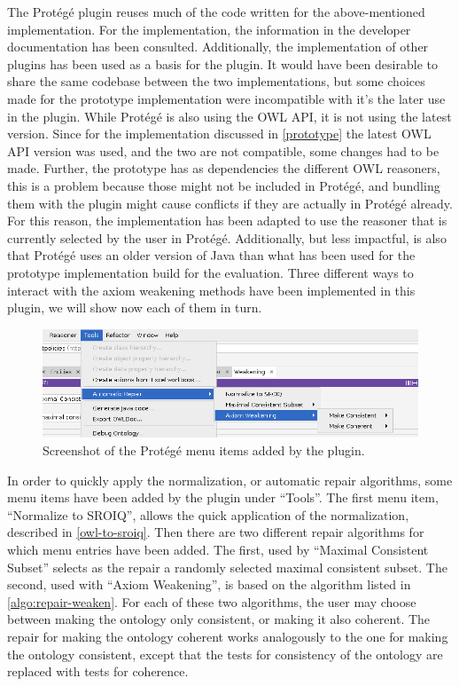 
The Protégé plugin reuses much of the code written for the above-mentioned implementation. For the implementation, the information in the developer documentation \cite{protege5devdocs} has been consulted. Additionally, the implementation of other plugins \cite{ontodebug,protegepluginexamples} has been used as a basis for the plugin. It would have been desirable to share the same codebase between the two implementations, but some choices made for the prototype implementation were incompatible with it's the later use in the plugin. While Protégé is also using the OWL API, it is not using the latest version. Since for the implementation discussed in \cref{prototype} the latest OWL API version was used, and the two are not compatible, some changes had to be made. Further, the prototype has as dependencies the different OWL reasoners, this is a problem because those might not be included in Protégé, and bundling them with the plugin might cause conflicts if they are actually in Protégé already. For this reason, the implementation has been adapted to use the reasoner that is currently selected by the user in Protégé. Additionally, but less impactful, is also that Protégé uses an older version of Java than what has been used for the prototype implementation build for the evaluation. Three different ways to interact with the axiom weakening methods have been implemented in this plugin, we will show now each of them in turn.

\begin{figure}[ht]
  \centering
  \includegraphics[width=\textwidth]{resources/protege-menu.png}
  \caption{Screenshot of the Protégé menu items added by the plugin.}
  \label{fig:protege-menu}
\end{figure}

In order to quickly apply the normalization, or automatic repair algorithms, some menu items have been added by the plugin under ``Tools''. The first menu item, ``Normalize to SROIQ'', allows the quick application of the normalization, described in \cref{owl-to-sroiq}. Then there are two different repair algorithms for which menu entries have been added. The first, used by ``Maximal Consistent Subset'' selects as the repair a randomly selected maximal consistent subset. The second, used with ``Axiom Weakening'', is based on the algorithm listed in \cref{algo:repair-weaken}. For each of these two algorithms, the user may choose between making the ontology only consistent, or making it also coherent. The repair for making the ontology coherent works analogously to the one for making the ontology consistent, except that the tests for consistency of the ontology are replaced with tests for coherence.

